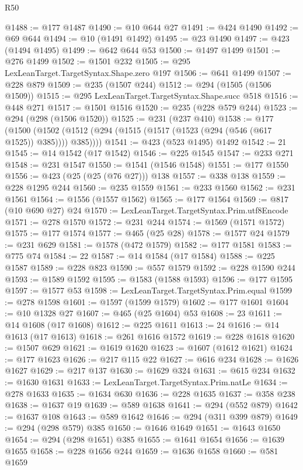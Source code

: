 \begin{lexlean}{R50}
\begin{coremodule}
@1488 := @177 @1487
@1490 := @10 @644 @27
@1491 := @424 @1490
@1492 := @69 @644
@1494 := @10 (@1491 @1492)
@1495 := @23 @1490
@1497 := @423 (@1494 @1495)
@1499 := @642 @644 @53
@1500 := @1497 @1499
@1501 := @276 @1499
@1502 := @1501 @232
@1505 := @295 LexLeanTarget.TargetSyntax.Shape.zero @197
@1506 := @641 @1499
@1507 := @228 @879
@1509 := @235 (@1507 @244)
@1512 := @294 (@1505 (@1506 @1509))
@1515 := @295 LexLeanTarget.TargetSyntax.Shape.succ @518
@1516 := @448 @271
@1517 := @1501 @1516
@1520 := @235 (@228 @579 @244)
@1523 := @294 (@298 (@1506 @1520))
@1525 := @231 (@237 @410)
@1538 := @177
    (@1500 (@1502 (@1512 (@294 (@1515 (@1517 (@1523 (@294 (@546 (@617 @1525)) @385)))) @385))))
@1541 := @423 (@523 @1495) @1492
@1542 := 21
@1545 := @14 @1542 (@17 @1542)
@1546 := @225 @1545
@1547 := @233 @271
@1548 := @231 @1547
@1550 := @1541 (@1546 @1548)
@1551 := @177 @1550
@1556 := @423 (@25 (@25 (@76 @27))) @138
@1557 := @338 @138
@1559 := @228 @1295 @244
@1560 := @235 @1559
@1561 := @233 @1560
@1562 := @231 @1561
@1564 := @1556 (@1557 @1562)
@1565 := @177 @1564
@1569 := @817 (@10 @690 @27) @24
@1570 := LexLeanTarget.TargetSyntax.Prim.utf8Encode
@1571 := @278 @1570
@1572 := @231 @244
@1574 := @1569 (@1571 @1572)
@1575 := @177 @1574
@1577 := @465 (@25 @28)
@1578 := @1577 @24
@1579 := @231 @629
@1581 := @1578 (@472 @1579)
@1582 := @177 @1581
@1583 := @775 @74
@1584 := 22
@1587 := @14 @1584 (@17 @1584)
@1588 := @225 @1587
@1589 := @228 @823
@1590 := @557 @1579
@1592 := @228 @1590 @244
@1593 := @1589 @1592
@1595 := @1583 (@1588 @1593)
@1596 := @177 @1595
@1597 := @1577 @53
@1598 := LexLeanTarget.TargetSyntax.Prim.equal
@1599 := @278 @1598
@1601 := @1597 (@1599 @1579)
@1602 := @177 @1601
@1604 := @10 @1328 @27
@1607 := @465 (@25 @1604) @53
@1608 := 23
@1611 := @14 @1608 (@17 @1608)
@1612 := @225 @1611
@1613 := 24
@1616 := @14 @1613 (@17 @1613)
@1618 := @261 @1616 @1572
@1619 := @228 @1618
@1620 := @1507 @629
@1621 := @1619 @1620
@1623 := @1607 (@1612 @1621)
@1624 := @177 @1623
@1626 := @217 @115 @22
@1627 := @616 @234
@1628 := @1626 @1627
@1629 := @217 @137
@1630 := @1629 @324
@1631 := @615 @234
@1632 := @1630 @1631
@1633 := LexLeanTarget.TargetSyntax.Prim.natLe
@1634 := @278 @1633
@1635 := @1634 @630
@1636 := @228 @1635
@1637 := @358 @238
@1638 := @1637 @19
@1639 := @589 @1638
@1641 := @294 (@552 @879)
@1642 := @1637 @108
@1643 := @589 @1642
@1646 := @294 (@311 @399 @879)
@1649 := @294 (@298 @579) @385
@1650 := @1646 @1649
@1651 := @1643 @1650
@1654 := @294 (@298 @1651) @385
@1655 := @1641 @1654
@1656 := @1639 @1655
@1658 := @228 @1656 @244
@1659 := @1636 @1658
@1660 := @581 @1659

\end{coremodule}
\end{lexlean}
